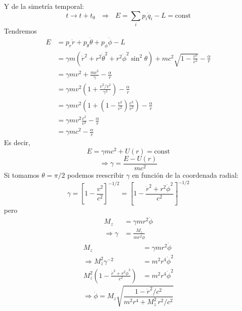 \documentclass[]{article}
\numberwithin{equation}{section}
\begin{document}
Y de la simetría temporal:
\begin{equation*}
	t \rightarrow t + t_{0} ~~~\Rightarrow~~~ E = \sum_{i} p_{i}\dot{q}_i - L = \mathrm{const}
\end{equation*}
Tendremos
\begin{align*}
	E &= p_{r}\dot{r} + p_{\theta}\dot{\theta} + p_{\phi}\dot{\phi} - L \\
	&= \gamma m \left(\dot{r}^2 + r^2 \dot{\theta}^2 + r^2 \dot{\phi}^2 \sin^2\theta\right) + mc^2 \sqrt{1 - \frac{v^2}{c^2}} - \frac{\alpha}{r}\\
	&= \gamma m v^2 + \frac{mc^2}{\gamma} - \frac{\alpha}{r}\\
	&= \gamma m v^2 \left(1 + \frac{c^2/v^2}{\gamma^2}\right) - \frac{\alpha}{r}\\
	&= \gamma m v^2 \left(1 + \left(1 - \frac{v^2}{c^2}\right) \frac{c^2}{v^2}\right) - \frac{\alpha}{r}\\
	&= \gamma m v^2 \frac{c^2}{v^2} - \frac{\alpha}{r}\\
	&= \gamma m c^2 - \frac{\alpha}{r}
\end{align*}
Es decir,
\begin{equation}
	E = \gamma m c^2 + U(r) = \mathrm{const}
\end{equation}
\begin{equation}
	\Rightarrow \gamma = \frac{E - U(r)}{m c^2} \label{gamma_E_U}
\end{equation}
Si tomamos \(\theta = \pi/2\) podemos reescribir \(\gamma\) en función de la coordenada radial:
\begin{equation*}
	\gamma = \left[1 - \frac{v^2}{c^2}\right]^{-1/2} = \left[1 - \frac{\dot{r}^2 + r^2\dot{\phi}^2}{c^2}\right]^{-1/2}
\end{equation*}
pero
\begin{align}
	M_{z} &= \gamma m r^2 \dot{\phi} \nonumber\\
	\Rightarrow \gamma &= \frac{M_{z}}{m r^2 \dot{\phi}}
\end{align}
\begin{align*}
	M_{z} &= \gamma m r^2 \dot{\phi} \\
	\Rightarrow M_{z}^{2}\gamma^{-2} &= m^2 r^4 \dot{\phi}^2\\
	M_{z}^{2} \left(1 - \frac{\dot{r}^2 + r^2\dot{\phi}^2}{c^2}\right) &= m^2 r^4 \dot{\phi}^2
\end{align*}
\begin{equation}
	\Rightarrow \dot{\phi} = M_{z}\sqrt{\frac{1 - \dot{r}^2/c^2}{m^2 r^4 + M_{z}^2 \, r^2/c^2}}
\end{equation}
\end{document}

